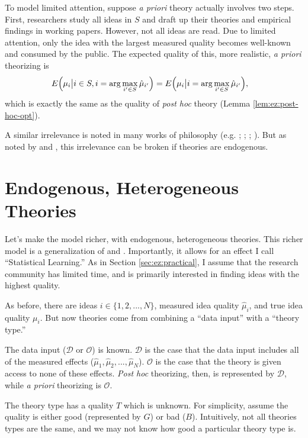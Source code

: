 \documentclass[12pt,english]{article}
\theoremstyle{plain}
\theoremstyle{plain}
\begin{document}
To model limited attention, suppose \emph{a priori} theory actually involves two steps. First, researchers study all ideas in $S$ and draft up their theories and empirical findings in working papers. However, not all ideas are read.  Due to limited attention, only the idea with the largest measured quality becomes well-known and consumed by the public. The expected quality of this, more realistic, \emph{a priori} theorizing is
\begin{align}
E\Bigl(\mu_{i}\big|i\in S ,i=\arg\max_{i'\in S }\hat{\mu}_{i'}\Bigr) 
& =
E\Bigl(\mu_{i}\big|i=\arg\max_{i'\in S }\hat{\mu}_{i'}\Bigr),
\end{align}
which is exactly the same as the quality of \emph{post hoc} theory (Lemma \ref{lem:ez:post-hoc-opt}).

A similar irrelevance is noted in many works of philosophy (e.g. \citet{hempel1966philosophy}; \citet{lakatos1970methodology}; \citet{rosenkrantz1977inference}; \citet{gardner1982predicting}).  But as noted by \citet{maher1988prediction} and \citet{kahn1996positive}, this irrelevance can be broken if theories are endogenous.

\section{Endogenous, Heterogeneous Theories}\label{sec:het}

Let's make the model richer, with endogenous, heterogeneous theories. This richer model is a generalization of \citet{maher1988prediction} and \citet{kahn1996positive}. Importantly, it allows for an effect I call ``Statistical Learning.'' As in Section \ref{sec:ez:practical}, I assume that the research community has limited time, and is primarily interested in finding ideas with the highest quality.

As before, there are ideas $i\in \{1,2,...,N\}$, measured idea quality $\hat{\mu}_{i}$, and true idea quality $\mu_{i}$. But now  theories come from combining a ``data input'' with a ``theory type.''  

The data input ($\mathcal{D}$ or $\mathcal{O}$) is  known. $\mathcal{D}$ is the case that the data input includes all of the measured effects ($\hat{\mu}_{1},\hat{\mu}_{2},...,\hat{\mu}_{N}$). $\mathcal{O}$ is the case that the theory is given access to none of these effects. \emph{Post hoc} theorizing, then, is represented by $\mathcal{D}$, while \emph{a priori} theorizing is $\mathcal{O}$.

The theory type has a quality $T$ which is unknown. For simplicity, assume the quality is either good (represented by $G$) or bad ($B$). Intuitively, not all theories types are the same, and we may not know how good a particular theory type is.
\end{document}
